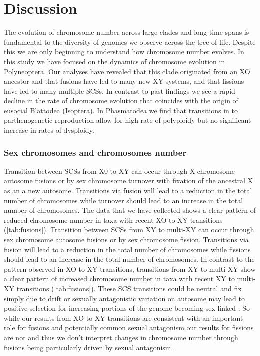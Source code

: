 \section{Discussion}
The evolution of chromosome number across large clades and long time spans is fundamental to the diversity of genomes we observe across the tree of life.
Despite this we are only beginning to understand how chromosome number evolves.
In this study we have focused on the dynamics of chromosome evolution in Polyneoptera. 
Our analyses have revealed that this clade originated from an XO ancestor and that fusions have led to many new XY systems, and that fissions have led to many multiple SCSs.
In contrast to past findings \citep{ross2015} we see a rapid decline in the rate of chromosome evolution that coincides with the origin of eusocial Blattodea (Isoptera).
In Phasmatodea we find that transitions in to parthenogenetic reproduction allow for high rate of polyploidy but no significant increase in rates of dysploidy.

\subsubsection{Sex chromosomes and chromosomes number}

Transition between SCSs from X0 to XY can occur through X chromosome autosome fusions or by sex chromosome turnover with fixation of the ancestral X as an a new autosome.
Transitions via fusion will lead to a reduction in the total number of chromosomes while turnover should lead to an increase in the total number of chromosomes.
The data that we have collected shows a clear pattern of reduced chromosome number in taxa with recent XO to XY transitions (\cref{tab:fusions}).
Transition between SCSs from XY to multi-XY can occur through sex chromosome autosome fusions or by sex chromosome fission.
Transitions via fusion will lead to a reduction in the total number of chromosomes while fissions should lead to an increase in the total number of chromosomes.
In contrast to the pattern observed in XO to XY transitions, transitions from XY to multi-XY show a clear pattern of increased chromosome number in taxa with recent XY to multi-XY transitions (\cref{tab:fusions}).
These SCS transitions could be neutral and fix simply due to drift or sexually antagonistic variation on autosome may lead to positive selection for increasing portions of the genome becoming sex-linked \citep{charlesworth1980, kitano2012}.
So while our results from XO to XY transitions are consistent with an important role for fusions and potentially common sexual antagonism our results for fissions are not and thus we don't interpret changes in chromosome number through fusions being particularly driven by sexual antagonism. 

